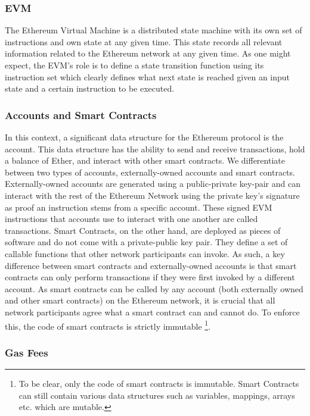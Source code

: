 \documentclass[letterpaper,twocolumn,10pt]{article}
\begin{document}
\subsubsection{EVM}

The Ethereum Virtual Machine is a distributed state machine with its own set of instructions and own state at any given time. This state records all relevant information related to the Ethereum network at any given time. As one might expect, the EVM's role is to define a state transition function using its instruction set which clearly defines what next state is reached given an input state and a certain instruction to be executed. 

\subsubsection{Accounts and Smart Contracts}


In this context, a significant data structure for the Ethereum protocol is the account. This data structure has the ability to send and receive transactions, hold a balance of Ether, and interact with other smart contracts. We differentiate between two types of accounts, externally-owned accounts and smart contracts. Externally-owned accounts are generated using a public-private key-pair and can interact with the rest of the Ethereum Network using the private key's signature as proof an instruction stems from a specific account. These signed EVM instructions that accounts use to interact with one another are called transactions.  Smart Contracts, on the other hand, are deployed as pieces of software and do not come with a private-public key pair. They define a set of callable functions that other network participants can invoke. As such, a key difference between smart contracts and externally-owned accounts is that smart contracts can only perform transactions if they were first invoked by a different account. As smart contracts can be called by any account (both externally owned and other smart contracts) on the Ethereum network, it is crucial that all network participants agree what a smart contract can and cannot do. To enforce this, the code of smart contracts is strictly immutable \footnote{To be clear, only the code of smart contracts is immutable. Smart Contracts can still contain various data structures such as variables, mappings, arrays etc. which are mutable.}.

\subsubsection{Gas Fees}
\end{document}
